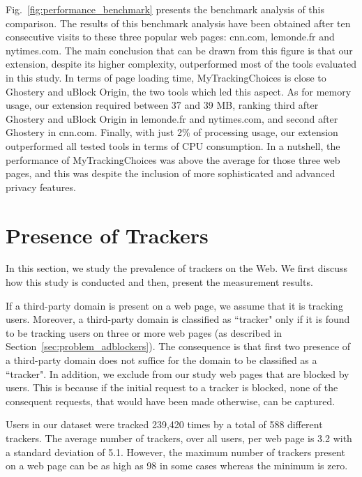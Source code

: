 \documentclass[conference]{IEEEtran}
\begin{document}
Fig.~\ref{fig:performance_benchmark} presents the benchmark analysis of this comparison.
The results of this benchmark analysis have been obtained after ten consecutive visits to these three popular web pages: 
cnn.com, lemonde.fr and nytimes.com.
The main conclusion that can be drawn from this figure is that our extension, despite its higher complexity, outperformed most of the tools evaluated in this study. 
In terms of page loading time, MyTrackingChoices is close to Ghostery and uBlock Origin, the two tools which led this aspect. 
As for memory usage, our extension required between 37 and 39 MB, ranking third after Ghostery and uBlock Origin in lemonde.fr and nytimes.com, and second after Ghostery in cnn.com. 
Finally, with just 2\% of processing usage, our extension outperformed all tested tools in terms of CPU consumption. 
In a nutshell, the performance of MyTrackingChoices was above the average for those three web pages, 
and this was despite the inclusion of more sophisticated and advanced privacy features.













\section{Presence of Trackers}
\label{sec:measurement_trackers}

In this section, we study the prevalence of trackers on the Web.
We first discuss how this study is conducted and then, present the measurement results.

If a third-party domain is present on a web page, we assume that it is tracking users.
Moreover, a third-party domain is classified as ``tracker" only if it is found to be tracking users on three or more web pages (as described in Section~\ref{sec:problem_adblockers}).
The consequence is that first two presence of a third-party domain does not suffice for the domain to be classified as a ``tracker".
In addition, we exclude from our study web pages that are blocked by users.
This is because if the initial request to a tracker is blocked, none of the consequent requests, that would have been made otherwise, can be captured.

Users in our dataset were tracked 239,420 times by a total of 588 different trackers.
The average number of trackers, over all users, per web page is 3.2 with a standard deviation of 5.1.
However, the maximum number of trackers present on a web page can be as high as 98 in some cases whereas the minimum is zero.
\end{document}

